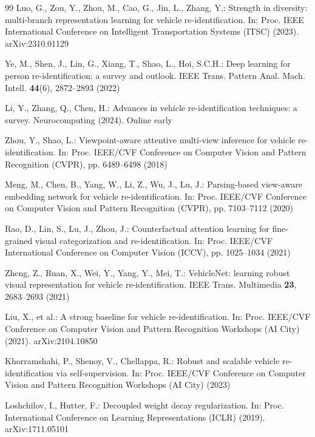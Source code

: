 \documentclass[10pt,a4paper]{article}
\begin{document}
\begin{thebibliography}{99}
Luo, G., Zou, Y., Zhou, M., Cao, G., Jin, L., Zhang, Y.: Strength in diversity:
multi-branch representation learning for vehicle re-identification. In: Proc.
IEEE International Conference on Intelligent Transportation Systems (ITSC)
(2023). arXiv:2310.01129

Ye, M., Shen, J., Lin, G., Xiang, T., Shao, L., Hoi, S.C.H.: Deep learning for
person re-identification: a survey and outlook. IEEE Trans. Pattern Anal. Mach.
Intell. \textbf{44}(6), 2872--2893 (2022)

Li, Y., Zhang, Q., Chen, H.: Advances in vehicle re-identification techniques: a
survey. Neurocomputing (2024). Online early

Zhou, Y., Shao, L.: Viewpoint-aware attentive multi-view inference for vehicle
re-identification. In: Proc. IEEE/CVF Conference on Computer Vision and Pattern
Recognition (CVPR), pp. 6489--6498 (2018)

Meng, M., Chen, B., Yang, W., Li, Z., Wu, J., Lu, J.: Parsing-based view-aware
embedding network for vehicle re-identification. In: Proc. IEEE/CVF Conference
on Computer Vision and Pattern Recognition (CVPR), pp. 7103--7112 (2020)

Rao, D., Lin, S., Lu, J., Zhou, J.: Counterfactual attention learning for
fine-grained visual categorization and re-identification. In: Proc. IEEE/CVF
International Conference on Computer Vision (ICCV), pp. 1025--1034 (2021)

Zheng, Z., Ruan, X., Wei, Y., Yang, Y., Mei, T.: VehicleNet: learning robust
visual representation for vehicle re-identification. IEEE Trans. Multimedia
\textbf{23}, 2683--2693 (2021)

Liu, X., et al.: A strong baseline for vehicle re-identification. In: Proc.
IEEE/CVF Conference on Computer Vision and Pattern Recognition Workshops (AI
City) (2021). arXiv:2104.10850

Khorramshahi, P., Shenoy, V., Chellappa, R.: Robust and scalable vehicle
re-identification via self-supervision. In: Proc. IEEE/CVF Conference on
Computer Vision and Pattern Recognition Workshops (AI City) (2023)

Loshchilov, I., Hutter, F.: Decoupled weight decay regularization. In: Proc.
International Conference on Learning Representations (ICLR) (2019).
arXiv:1711.05101


\end{thebibliography}
\end{document}
